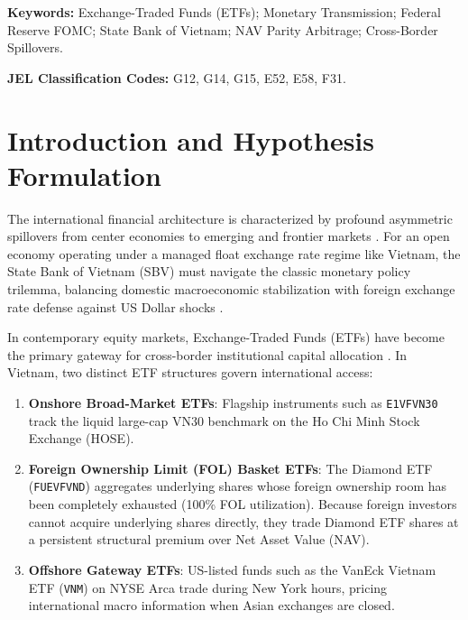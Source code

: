 \documentclass{article}
\begin{document}
\vspace{0.5em}
\noindent \textbf{Keywords:} Exchange-Traded Funds (ETFs); Monetary Transmission; Federal Reserve FOMC; State Bank of Vietnam; NAV Parity Arbitrage; Cross-Border Spillovers.

\vspace{0.5em}
\noindent \textbf{JEL Classification Codes:} G12, G14, G15, E52, E58, F31.

\newpage

\section{Introduction and Hypothesis Formulation}
\label{sec:intro}

The international financial architecture is characterized by profound asymmetric spillovers from center economies to emerging and frontier markets \citep{rey2015dilemma, miranda2020us}. For an open economy operating under a managed float exchange rate regime like Vietnam, the State Bank of Vietnam (SBV) must navigate the classic monetary policy trilemma, balancing domestic macroeconomic stabilization with foreign exchange rate defense against US Dollar shocks \citep{bernanke2005what}.

In contemporary equity markets, Exchange-Traded Funds (ETFs) have become the primary gateway for cross-border institutional capital allocation \citep{engle2006premiums, petajisto2017inefficiencies}. In Vietnam, two distinct ETF structures govern international access:
\begin{enumerate}
    \item \textbf{Onshore Broad-Market ETFs}: Flagship instruments such as \texttt{E1VFVN30} track the liquid large-cap VN30 benchmark on the Ho Chi Minh Stock Exchange (HOSE).
    \item \textbf{Foreign Ownership Limit (FOL) Basket ETFs}: The Diamond ETF (\texttt{FUEVFVND}) aggregates underlying shares whose foreign ownership room has been completely exhausted (100\% FOL utilization). Because foreign investors cannot acquire underlying shares directly, they trade Diamond ETF shares at a persistent structural premium over Net Asset Value (NAV).
    \item \textbf{Offshore Gateway ETFs}: US-listed funds such as the VanEck Vietnam ETF (\texttt{VNM}) on NYSE Arca trade during New York hours, pricing international macro information when Asian exchanges are closed.
\end{enumerate}
\end{document}
